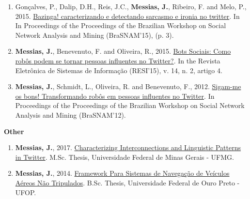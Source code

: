 \begin{enumerate}
    \item Gonçalves, P., Dalip, D.H., Reis, J.C., \textbf{Messias, J.}, Ribeiro, F. and Melo, P., 2015. \href{https://people.mpi-sws.org/~johnme/pdf/goncalves_brasnam15.pdf}{Bazinga! caracterizando e detectando sarcasmo e ironia no twitter}. In In Proceedings of the Proceedings of the Brazilian Workshop on Social Network Analysis and Mining (BraSNAM'15), (p. 3).
    \item \textbf{Messias, J.}, Benevenuto, F. and Oliveira, R., 2015. \href{https://people.mpi-sws.org/~johnme/pdf/messias_ctic13.pdf}{Bots Sociais: Como robôs podem se tornar pessoas influentes no Twitter?}. In the Revista Eletrônica de Sistemas de Informação (RESI'15), v. 14, n. 2, artigo 4.
    \item \textbf{Messias, J.}, Schmidt, L., Oliveira, R. and Benevenuto, F., 2012. \href{https://people.mpi-sws.org/~johnme/pdf/messias-brasnam12.pdf}{Sigam-me os bons! Transformando robôs em pessoas influentes no Twitter}. In Proceedings of the Proceedings of the Brazilian Workshop on Social Network Analysis and Mining (BraSNAM'12).

\end{enumerate}

\textbf{Other}

\begin{enumerate}
    \item \textbf{Messias, J.}, 2017. \href{https://people.mpi-sws.org/~johnme/pdf/master-thesis_johnnatan_messias.pdf}{Characterizing Interconnections and Linguistic Patterns in Twitter}. M.Sc. Thesis, Universidade Federal de Minas Gerais - UFMG.
    \item \textbf{Messias, J.}, 2014. \href{https://people.mpi-sws.org/~johnme/pdf/mono_johnnatan_messias-15.pdf}{Framework Para Sistemas de Navegação de Veículos Aéreos Não Tripulados}. B.Sc. Thesis, Universidade Federal de Ouro Preto - UFOP.

\end{enumerate}


